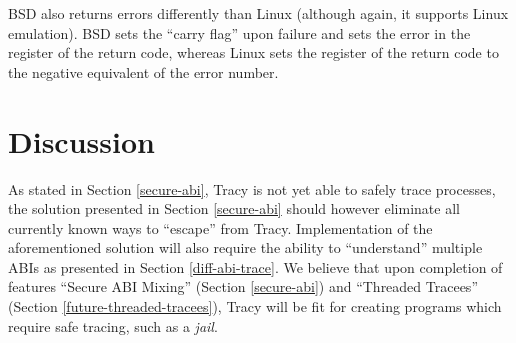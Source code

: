 \documentclass[a4paper, 10pt]{report}
\begin{document}
BSD also returns errors differently than Linux (although again, it supports
Linux emulation). BSD sets the ``carry flag'' upon failure and sets the error
in the register of the return code, whereas Linux sets the register of the
return code to the negative equivalent of the error number\cite{bsdasm}.






% 


\chapter{Discussion}

As stated in Section \ref{secure-abi}, Tracy is not yet able to safely trace
processes, the solution presented in Section \ref{secure-abi} should however
eliminate all currently known ways to ``escape'' from Tracy. Implementation of 
the aforementioned solution will also require the ability to ``understand''
multiple ABIs as presented in Section \ref{diff-abi-trace}. %
We believe that upon completion of features ``Secure ABI Mixing'' (Section
\ref{secure-abi}) and ``Threaded Tracees'' (Section
\ref{future-threaded-tracees}),
Tracy will be fit for creating programs which require safe tracing,
such as a \textit{jail}. 
\end{document}
